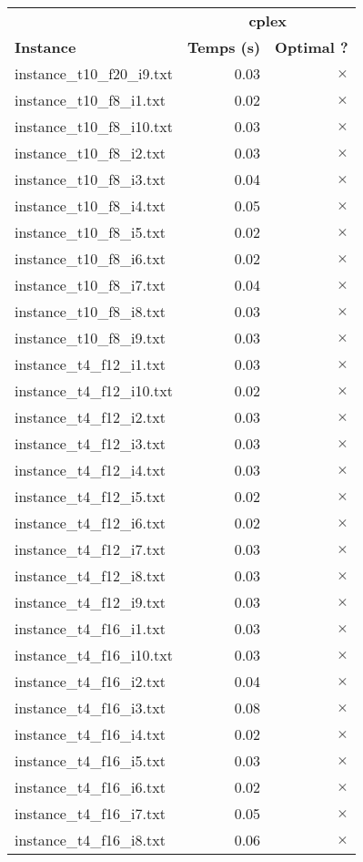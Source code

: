 \documentclass{article}
\begin{document}
\newpage
\begin{center}
\renewcommand{\arraystretch}{1.4} 
\begin{tabular}{lrr}
	\hline
 & \multicolumn{2}{c}{\textbf{cplex}}\\
\textbf{Instance}  & \textbf{Temps (s)} & \textbf{Optimal ?} \\\hline

instance\_t10\_f20\_i9.txt & 0.03 & 
$\times$
\\
instance\_t10\_f8\_i1.txt & 0.02 & 
$\times$
\\
instance\_t10\_f8\_i10.txt & 0.03 & 
$\times$
\\
instance\_t10\_f8\_i2.txt & 0.03 & 
$\times$
\\
instance\_t10\_f8\_i3.txt & 0.04 & 
$\times$
\\
instance\_t10\_f8\_i4.txt & 0.05 & 
$\times$
\\
instance\_t10\_f8\_i5.txt & 0.02 & 
$\times$
\\
instance\_t10\_f8\_i6.txt & 0.02 & 
$\times$
\\
instance\_t10\_f8\_i7.txt & 0.04 & 
$\times$
\\
instance\_t10\_f8\_i8.txt & 0.03 & 
$\times$
\\
instance\_t10\_f8\_i9.txt & 0.03 & 
$\times$
\\
instance\_t4\_f12\_i1.txt & 0.03 & 
$\times$
\\
instance\_t4\_f12\_i10.txt & 0.02 & 
$\times$
\\
instance\_t4\_f12\_i2.txt & 0.03 & 
$\times$
\\
instance\_t4\_f12\_i3.txt & 0.03 & 
$\times$
\\
instance\_t4\_f12\_i4.txt & 0.03 & 
$\times$
\\
instance\_t4\_f12\_i5.txt & 0.02 & 
$\times$
\\
instance\_t4\_f12\_i6.txt & 0.02 & 
$\times$
\\
instance\_t4\_f12\_i7.txt & 0.03 & 
$\times$
\\
instance\_t4\_f12\_i8.txt & 0.03 & 
$\times$
\\
instance\_t4\_f12\_i9.txt & 0.03 & 
$\times$
\\
instance\_t4\_f16\_i1.txt & 0.03 & 
$\times$
\\
instance\_t4\_f16\_i10.txt & 0.03 & 
$\times$
\\
instance\_t4\_f16\_i2.txt & 0.04 & 
$\times$
\\
instance\_t4\_f16\_i3.txt & 0.08 & 
$\times$
\\
instance\_t4\_f16\_i4.txt & 0.02 & 
$\times$
\\
instance\_t4\_f16\_i5.txt & 0.03 & 
$\times$
\\
instance\_t4\_f16\_i6.txt & 0.02 & 
$\times$
\\
instance\_t4\_f16\_i7.txt & 0.05 & 
$\times$
\\
instance\_t4\_f16\_i8.txt & 0.06 & 
$\times$
\\
\hline\end{tabular}
\end{center}
\end{document}
